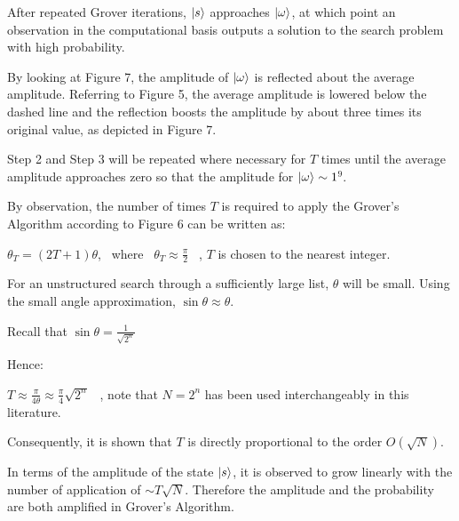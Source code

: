 \documentclass{article}
\begin{document}
\noindent
After repeated Grover iterations, $\ket{s}$ approaches $\ket{\omega}$, at which point an observation in the computational basis
outputs a solution to the search problem with high probability.
\vspace{5mm}

\noindent
By looking at Figure 7, the amplitude of $\ket{\omega}$ is reflected about the average amplitude. Referring to Figure 5, the average amplitude is lowered below the dashed line and the reflection boosts the amplitude by about three times its original value, as depicted in Figure 7.
\vspace{5mm}

\noindent
Step 2 and Step 3 will be repeated where necessary for $T$ times until the average amplitude approaches zero so that the amplitude for $\ket{\omega} \sim 1$\hyperlink{9}{$^9$}.
\vspace{5mm}

\noindent
By observation, the number of times $T$ is required to apply the Grover's Algorithm according to Figure 6 can be written as:
\vspace{5mm}

\noindent
\qquad $\theta_T = (2T + 1)\theta$, \ where \ $\theta_T \approx \frac{\pi}{2}$ \ , $T$ is chosen to the nearest integer. 
\vspace{5mm}

\noindent
For an unstructured search through a sufficiently large list, $\theta$ will be small. Using the small angle approximation, $\sin\theta \approx \theta$. 
\vspace{5mm}

\noindent
Recall that $\sin\theta = \frac{1}{\sqrt{2^n}}$
\vspace{5mm}

\noindent
Hence:
\vspace{5mm}

\noindent
\qquad $T \approx \frac{\pi}{4\theta} \approx \frac{\pi}{4}\sqrt{2^n}$ \ , note that $N = 2^n$ has been used interchangeably in this literature.
\vspace{5mm}

\noindent
Consequently, it is shown that $T$ is directly proportional to the order $O(\sqrt{N})$.
\pagebreak

\noindent
In terms of the amplitude of the state $\ket{s}$, it is observed to grow linearly with the number of application of $\sim T\sqrt{N}$. Therefore the amplitude and the probability are both amplified in Grover's Algorithm.
\vspace{5mm}
\end{document}
